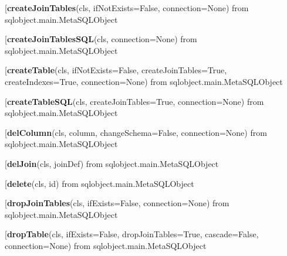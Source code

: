 \begin{description}\item[{\bf createJoinTables}(cls, ifNotExists=False, connection=None) from sqlobject.main.MetaSQLObject\end{description}

\begin{description}\item[{\bf createJoinTablesSQL}(cls, connection=None) from sqlobject.main.MetaSQLObject\end{description}

\begin{description}\item[{\bf createTable}(cls, ifNotExists=False, createJoinTables=True, createIndexes=True, connection=None) from sqlobject.main.MetaSQLObject\end{description}

\begin{description}\item[{\bf createTableSQL}(cls, createJoinTables=True, connection=None) from sqlobject.main.MetaSQLObject\end{description}

\begin{description}\item[{\bf delColumn}(cls, column, changeSchema=False, connection=None) from sqlobject.main.MetaSQLObject\end{description}

\begin{description}\item[{\bf delJoin}(cls, joinDef) from sqlobject.main.MetaSQLObject\end{description}

\begin{description}\item[{\bf delete}(cls, id) from sqlobject.main.MetaSQLObject\end{description}

\begin{description}\item[{\bf dropJoinTables}(cls, ifExists=False, connection=None) from sqlobject.main.MetaSQLObject\end{description}

\begin{description}\item[{\bf dropTable}(cls, ifExists=False, dropJoinTables=True, cascade=False, connection=None) from sqlobject.main.MetaSQLObject\end{description}

